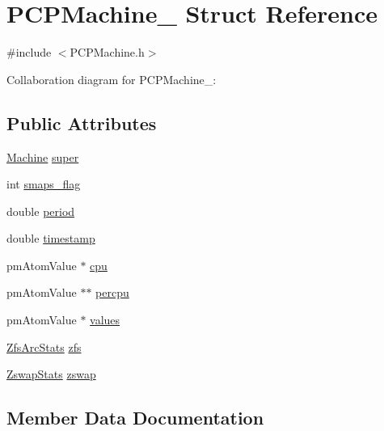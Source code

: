 \hypertarget{structPCPMachine__}{}\section{P\+C\+P\+Machine\+\_\+ Struct Reference}
\label{structPCPMachine__}


{\ttfamily \#include $<$P\+C\+P\+Machine.\+h$>$}



Collaboration diagram for P\+C\+P\+Machine\+\_\+\+:
\subsection*{Public Attributes}
\begin{DoxyCompactItemize}
\item 
\hyperlink{Machine_8h_aa3706f95e4706b9d02979efcabb1341d}{Machine} \hyperlink{structPCPMachine___a8f9ff9fa96604aab2aa7907e82f32331}{super}
\item 
int \hyperlink{structPCPMachine___a82c92f8f586dd2026790980002c12b4c}{smaps\+\_\+flag}
\item 
double \hyperlink{structPCPMachine___a328de01124abac43014ef03bd3743a43}{period}
\item 
double \hyperlink{structPCPMachine___a09dcfe204a695b0a70a95b40c2089668}{timestamp}
\item 
pm\+Atom\+Value $\ast$ \hyperlink{structPCPMachine___a4f2cdb7c8e29c887ff34f934ae2a5c16}{cpu}
\item 
pm\+Atom\+Value $\ast$$\ast$ \hyperlink{structPCPMachine___ae239d9a4b00528fa2361aba9be721bf5}{percpu}
\item 
pm\+Atom\+Value $\ast$ \hyperlink{structPCPMachine___a8cc5c4d342580a24541ce80b8a7200b9}{values}
\item 
\hyperlink{ZfsArcStats_8h_a2adeccbbba50329f61d34f355e5faddc}{Zfs\+Arc\+Stats} \hyperlink{structPCPMachine___abfed51aa24b77dc539d9bf210c139702}{zfs}
\item 
\hyperlink{ZswapStats_8h_ad2bd350512b2d43b858fc4632f2c4b26}{Zswap\+Stats} \hyperlink{structPCPMachine___a8c5b561725c830dfdd2803c1b77de396}{zswap}
\end{DoxyCompactItemize}


\subsection{Member Data Documentation}
\mbox{\label{structPCPMachine___a4f2cdb7c8e29c887ff34f934ae2a5c16}} 
